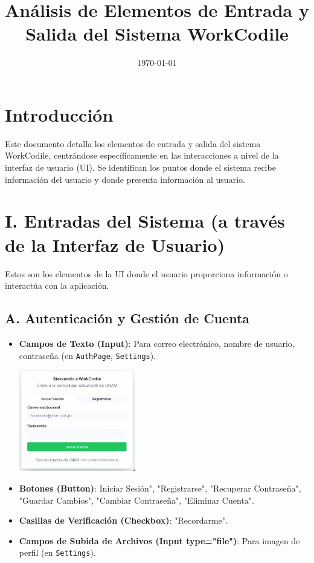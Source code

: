 \documentclass{article}
\title{Análisis de Elementos de Entrada y Salida del Sistema WorkCodile}
\date{\today}
\begin{document}
	\maketitle

	\section*{Introducción}
	Este documento detalla los elementos de entrada y salida del sistema
	WorkCodile, centrándose específicamente en las interacciones a nivel de la interfaz
	de usuario (UI). Se identifican los puntos donde el sistema recibe información
	del usuario y donde presenta información al usuario.

	\section*{I. Entradas del Sistema (a través de la Interfaz de Usuario)}
	Estos son los elementos de la UI donde el usuario proporciona información o
	interactúa con la aplicación.

	\subsection*{A. Autenticación y Gestión de Cuenta}
	\begin{itemize}
		\item \textbf{Campos de Texto (Input)}: Para correo electrónico, nombre de
			usuario, contraseña (en \texttt{AuthPage}, \texttt{Settings}).
			\begin{center}
				\includegraphics[width=0.4\textwidth]{img/01.jpg}
			\end{center}

		\item \textbf{Botones (Button)}: Iniciar Sesión", "Registrarse", "Recuperar Contraseña",
			"Guardar Cambios", "Cambiar Contraseña", "Eliminar Cuenta".

		\item \textbf{Casillas de Verificación (Checkbox)}: "Recordarme".

		\item \textbf{Campos de Subida de Archivos (Input type="file")}: Para imagen
			de perfil (en \texttt{Settings}).
	\end{itemize}
\end{document}
